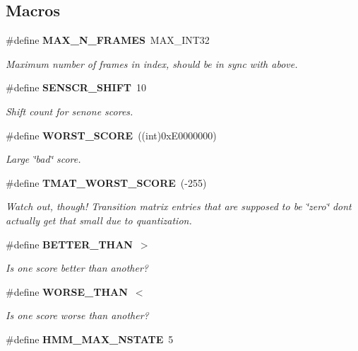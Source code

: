 \subsection*{Macros}
\begin{DoxyCompactItemize}
\item 
\#define {\bf M\+A\+X\+\_\+\+N\+\_\+\+F\+R\+A\+M\+E\+S}~M\+A\+X\+\_\+\+I\+N\+T32\label{hmm_8h_a5b6b9157cfaaec312508eaed602f0698}

\begin{DoxyCompactList}\small\item\em Maximum number of frames in index, should be in sync with above. \end{DoxyCompactList}\item 
\#define {\bf S\+E\+N\+S\+C\+R\+\_\+\+S\+H\+I\+F\+T}~10
\begin{DoxyCompactList}\small\item\em Shift count for senone scores. \end{DoxyCompactList}\item 
\#define {\bf W\+O\+R\+S\+T\+\_\+\+S\+C\+O\+R\+E}~((int)0x\+E0000000)
\begin{DoxyCompactList}\small\item\em Large \char`\"{}bad\char`\"{} score. \end{DoxyCompactList}\item 
\#define {\bf T\+M\+A\+T\+\_\+\+W\+O\+R\+S\+T\+\_\+\+S\+C\+O\+R\+E}~(-\/255)\label{hmm_8h_a9b38399b544dbb93bc9b7d0094e91db7}

\begin{DoxyCompactList}\small\item\em Watch out, though! Transition matrix entries that are supposed to be \char`\"{}zero\char`\"{} don\textquotesingle{}t actually get that small due to quantization. \end{DoxyCompactList}\item 
\#define {\bf B\+E\+T\+T\+E\+R\+\_\+\+T\+H\+A\+N}~$>$\label{hmm_8h_a2874ab52613ff781c96f570ec0eb0d98}

\begin{DoxyCompactList}\small\item\em Is one score better than another? \end{DoxyCompactList}\item 
\#define {\bf W\+O\+R\+S\+E\+\_\+\+T\+H\+A\+N}~$<$\label{hmm_8h_aa930fb8fb6fce7f34bcf4018b81d7066}

\begin{DoxyCompactList}\small\item\em Is one score worse than another? \end{DoxyCompactList}\item 
\#define {\bf H\+M\+M\+\_\+\+M\+A\+X\+\_\+\+N\+S\+T\+A\+T\+E}~5\label{hmm_8h_a1eb055ab0e55008f27d78e7b07a55a1c}


\end{DoxyCompactItemize}
